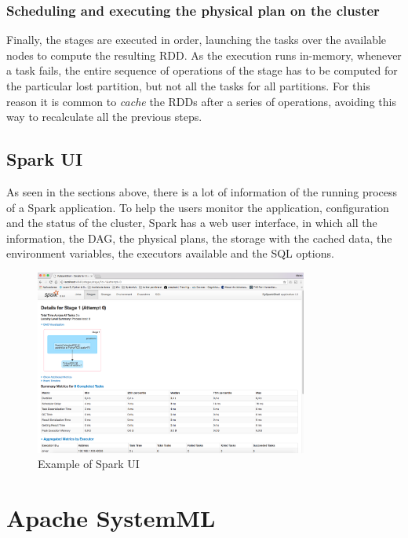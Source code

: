 \documentclass[11pt]{book} %
\begin{document}
        \subsubsection{Scheduling and executing the physical plan on the cluster}

          Finally, the stages are executed in order, launching the tasks over the available nodes to compute the resulting RDD. As the execution runs in-memory, whenever a task fails, the entire sequence of operations of the stage has to be computed for the particular lost partition, but not all the tasks for all partitions. For this reason it is common to \emph{cache} the RDDs after a series of operations, avoiding this way to recalculate all the previous steps.

      \subsection{Spark UI}

        As seen in the sections above, there is a lot of information of the running process of a Spark application. To help the users monitor the application, configuration and the status of the cluster, Spark has a web user interface, in which all the information, the DAG, the physical plans, the storage with the cached data, the environment variables, the executors available and the SQL options.

        \begin{figure}[!ht]
          \centering
          \includegraphics[width=0.8\textwidth]{spark_ui.png}
          \caption{Example of Spark UI}
          \label{img:spark_ui}
        \end{figure}

\newpage

  \section{Apache SystemML}
\end{document}
